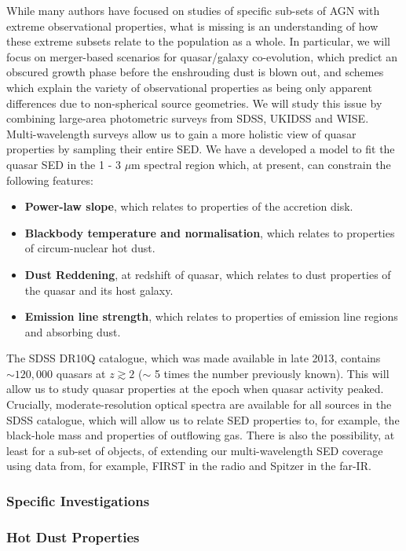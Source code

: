 While many authors have focused on studies of specific sub-sets of AGN with extreme observational properties, what is missing is an understanding of how these extreme subsets relate to the population as a whole. In particular, we will focus on merger-based scenarios for quasar/galaxy co-evolution, which predict an obscured growth phase before the enshrouding dust is blown out, and schemes which explain the variety of observational properties as being only apparent differences due to non-spherical source geometries. We will study this issue by combining large-area photometric surveys from SDSS, UKIDSS and WISE. Multi-wavelength surveys allow us to gain a more holistic view of quasar properties by sampling their entire SED. We have a developed a model to fit the quasar SED in the 1 - 3 $\mu$m spectral region which, at present, can constrain the following features:

\begin{itemize}
\item {\bf Power-law slope}, which relates to properties of the accretion disk.
\item {\bf Blackbody temperature and normalisation}, which relates to properties of circum-nuclear hot dust. 
\item {\bf Dust Reddening}, at redshift of quasar, which relates to dust properties of the quasar and its host galaxy. 
\item {\bf Emission line strength}, which relates to properties of emission line regions and absorbing dust. 
\end{itemize}

The SDSS DR10Q catalogue, which was made available in late 2013, contains $\sim 120,000$ quasars at $z\gtrsim2$ ($\sim$ 5 times the number previously known). This will allow us to study quasar properties at the epoch when quasar activity peaked. Crucially, moderate-resolution optical spectra are available for all sources in the SDSS catalogue, which will allow us to relate SED properties to, for example, the black-hole mass and properties of outflowing gas. There is also the possibility, at least for a sub-set of objects, of extending our multi-wavelength SED coverage using data from, for example, FIRST in the radio and Spitzer in the far-IR. 

\subsubsection{Specific Investigations}

\subsubsection{Hot Dust Properties}


